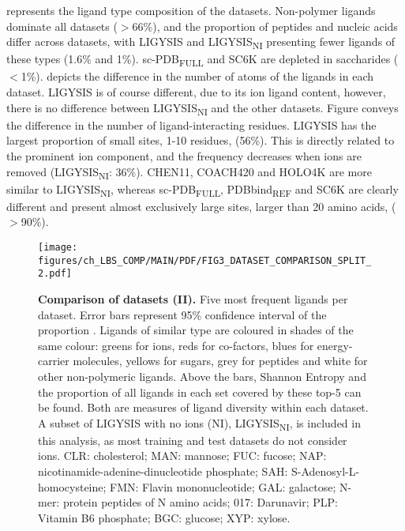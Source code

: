  represents the ligand type composition of the datasets. Non-polymer ligands dominate all datasets ($>$66\%), and the proportion of peptides and nucleic acids differ across datasets, with LIGYSIS and LIGYSIS\textsubscript{NI} presenting fewer ligands of these types (1.6\% and 1\%). sc-PDB\textsubscript{FULL} and SC6K are depleted in saccharides ($<$1\%).  depicts the difference in the number of atoms of the ligands in each dataset. LIGYSIS is of course different, due to its ion ligand content, however, there is no difference between LIGYSIS\textsubscript{NI} and the other datasets. Figure  conveys the difference in the number of ligand-interacting residues. LIGYSIS has the largest proportion of small sites, 1-10 residues, (56\%). This is directly related to the prominent ion component, and the frequency decreases when ions are removed (LIGYSIS\textsubscript{NI}: 36\%). CHEN11, COACH420 and HOLO4K are more similar to LIGYSIS\textsubscript{NI}, whereas sc-PDB\textsubscript{FULL}, PDBbind\textsubscript{REF} and SC6K are clearly different and present almost exclusively large sites, larger than 20 amino acids, ($>$90\%).

\begin{figure}[ht!]
    \centering
    \texttt{[image: figures/ch\_LBS\_COMP/MAIN/PDF/FIG3\_DATASET\_COMPARISON\_SPLIT\_2.pdf]}
    \caption[Comparison of datasets (II)]{\textbf{Comparison of datasets (II).} Five most frequent ligands per dataset. Error bars represent 95\% confidence interval of the proportion \cite{WILSON_197_PROP_CI}. Ligands of similar type are coloured in shades of the same colour: greens for ions, reds for co-factors, blues for energy-carrier molecules, yellows for sugars, grey for peptides and white for other non-polymeric ligands. Above the bars, Shannon Entropy and the proportion of all ligands in each set covered by these top-5 can be found. Both are measures of ligand diversity within each dataset. A subset of LIGYSIS with no ions (NI), LIGYSIS\textsubscript{NI}, is included in this analysis, as most training and test datasets do not consider ions. CLR: cholesterol; MAN: mannose; FUC: fucose; NAP: nicotinamide-adenine-dinucleotide phosphate; SAH: S-Adenosyl-L-homocysteine; FMN: Flavin mononucleotide; GAL: galactose; N-mer: protein peptides of N amino acids; 017: Darunavir; PLP: Vitamin B6 phosphate; BGC: glucose; XYP: xylose.}
    \label{fig:dataset_comp_2}
\end{figure}

